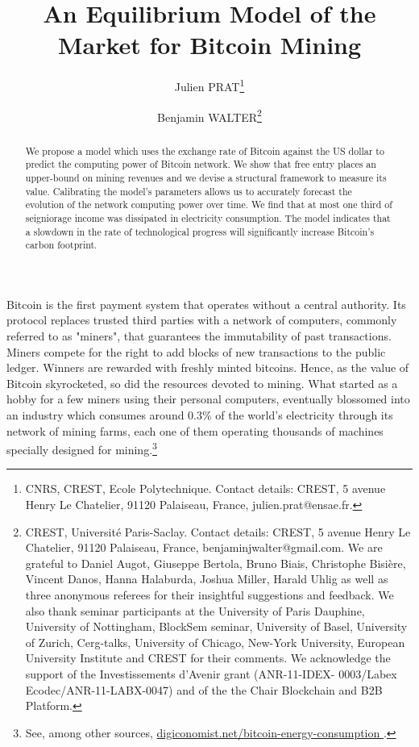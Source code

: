 \documentclass[12pt, a4paper]{article}
\makeatletter
\renewcommand{\section}{\@startsection{section}{2}{0mm}{-0.8\baselineskip}{.5\baselineskip}{\normalfont\large\bfseries}}
\makeatother
\begin{document}
\title{An Equilibrium Model of the Market for Bitcoin Mining}
\author{Julien PRAT\thanks{%
CNRS, CREST, Ecole Polytechnique. Contact details: CREST, 5 avenue Henry Le
Chatelier, 91120 Palaiseau, France, julien.prat@ensae.fr.} \and Benjamin
WALTER\thanks{%
CREST, Université Paris-Saclay. Contact details: CREST, 5
avenue Henry Le Chatelier, 91120 Palaiseau, France,
benjaminjwalter@gmail.com. We are grateful to Daniel Augot, Giuseppe Bertola, Bruno Biais, Christophe Bisi\`{e}re, Vincent Danos,
Hanna Halaburda, Joshua Miller, Harald Uhlig as well as three anonymous referees for their insightful suggestions and feedback. We also
thank seminar participants at the University of Paris Dauphine, University
of Nottingham, BlockSem seminar, University of Basel, University of Zurich,
Cerg-talks, University of Chicago, New-York University, European University Institute and CREST for their comments. We
acknowledge the support of the Investissements d'Avenir grant (ANR-11-IDEX- 0003/Labex Ecodec/ANR-11-LABX-0047) and of the
the Chair Blockchain and B2B Platform.} }
\maketitle

\begin{abstract}
We propose a model which uses the exchange rate of Bitcoin against the US dollar
to predict the computing power of Bitcoin network. We show that free entry places an
upper-bound on mining revenues and we devise a structural framework to
measure its value. Calibrating the model's parameters allows us to
accurately forecast the evolution of the network computing power over time.
We find that at most one third of
seigniorage income was dissipated in electricity consumption. The model
indicates that a slowdown in the rate of technological progress will
significantly increase Bitcoin's carbon footprint.
\end{abstract}

\newpage

\section{Introduction}

Bitcoin is the first payment system that operates without a central authority.
Its protocol replaces trusted third parties with a network of computers, commonly referred to as "miners",
that guarantees the immutability of past transactions.
Miners compete for the right to add blocks of new transactions to the public ledger.
Winners are rewarded with freshly minted bitcoins. Hence, as the value of Bitcoin skyrocketed,
so did the resources devoted to mining.
What started as a hobby for a few miners using their personal computers,
eventually blossomed into an industry which consumes around 0.3\% of the
world's electricity through its network of mining farms, each one of them operating
thousands of machines specially designed for mining.\footnote{%
See, among other sources, \href{https://digiconomist.net/bitcoin-energy-consumption}%
{digiconomist.net/bitcoin-energy-consumption }.}
\end{document}
